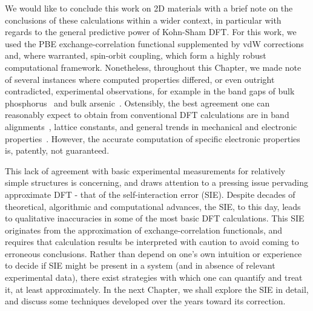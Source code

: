 We would like to conclude this 
work on 2D materials with a brief note on 
the conclusions of these calculations
 within a wider context, 
in particular with regards to the general 
predictive power of Kohn-Sham DFT.
%
For this work, we used the 
PBE exchange-correlation functional 
supplemented by vdW corrections 
and, where warranted, spin-orbit coupling, 
which form a highly robust  
computational framework.
%
Nonetheless, 
throughout this Chapter, 
we made note of several instances 
where computed properties differed, 
or even outright contradicted, 
experimental observations, 
for example in the band gaps of 
bulk phosphorus~\cite{Morita1986,doi:10.1063/1.1729699,NARITA1983422,MARUYAMA198199} 
and bulk arsenic~\cite{doi:10.1080/00018737900101355}.
%
Ostensibly, the best agreement one can 
reasonably expect to obtain 
from conventional DFT calculations 
are in band alignments~\cite{PhysRevB.90.155405}, 
lattice constants, 
and general trends in 
mechanical and electronic 
properties~\cite{PhysRevB.70.125426,PhysRevB.90.085402}.
%
%
However, the accurate computation 
of specific electronic properties 
is, patently, not guaranteed.

{
This lack of agreement 
with basic experimental measurements 
for relatively simple structures 
is concerning, 
and draws attention to a pressing issue 
pervading approximate DFT - 
that of the self-interaction error (SIE).
%
Despite decades of 
theoretical, algorithmic and computational advances, 
the SIE, to this day, 
leads to qualitative inaccuracies
 in some of the most basic DFT 
 calculations.
%
This SIE originates from 
the approximation of  
exchange-correlation functionals, 
{and requires that calculation results 
be interpreted with caution} 
to avoid coming to erroneous conclusions.
%
Rather than depend on 
one's own intuition or experience to decide 
if SIE might be present in a system 
(and in absence of relevant experimental data), 
there exist strategies with which one can quantify 
and treat it, 
at least approximately.
%
%
In the next Chapter, 
we shall explore the SIE in detail, 
and discuss some techniques 
developed over the years toward its correction.}










